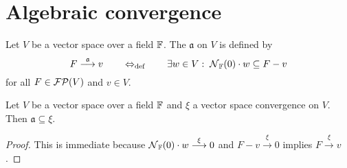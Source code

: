 \chapter{Algebraic convergence}
\begin{definition}
Let $V$ be a vector space over a field $\mathbb{F}$. The  $\mathfrak{a}$ on $V$ is defined by
\[ F\overset{\mathfrak{a}}{\longrightarrow} v \quad\quad\Leftrightarrow_{\text{def}}\quad\quad \exists w\in V: \; \operatorname{\mathcal{N}}_{\mathbb{F}}(0)\cdot w \subseteq F - v \]
for all $F\in \operatorname{\mathcal{FP}}(V)$ and $v\in V$.
\end{definition}

\begin{lemma} \label{algebraicConvergenceStrongerThanVectorConvergence}
Let $V$ be a vector space over a field $\mathbb{F}$ and $\xi$ a vector space convergence on $V$. Then $\mathfrak{a} \subseteq \xi$.
\end{lemma}
\begin{proof}
This is immediate because $\operatorname{\mathcal{N}}_{\mathbb{F}}(0)\cdot w \overset{\xi}{\longrightarrow} 0$ and $F-v\overset{\xi}{\longrightarrow}0$ implies $F\overset{\xi}{\longrightarrow} v$.
\end{proof}

